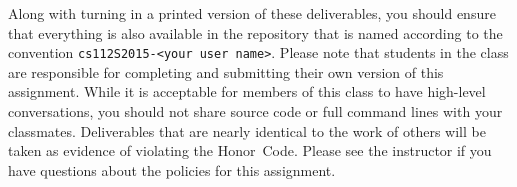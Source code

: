   Along with turning in a printed version of these deliverables, you should ensure that everything is also available in
  the repository that is named according to the convention {\tt cs112S2015-<your user name>}. Please note that students
  in the class are responsible for completing and submitting their own version of this assignment.    While it is
  acceptable for members of this class to have high-level conversations, you should not share source code or full
  command lines with your classmates.  Deliverables that are nearly identical to the work of others will be taken as
  evidence of violating the \mbox{Honor Code}.  Please see the instructor if you have questions about the policies for
  this assignment.

  

